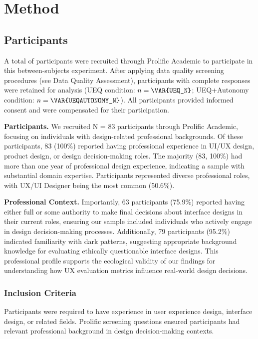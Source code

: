 
\section{Method}

\subsection{Participants}
A total of \texttt{} participants were recruited through Prolific Academic to participate in this between-subjects experiment. After applying data quality screening procedures (see Data Quality Assessment), \texttt{} participants with complete responses were retained for analysis (UEQ condition: $n = \texttt{\VAR{UEQ\_N}}$; UEQ+Autonomy condition: $n = \texttt{\VAR{UEQAUTONOMY\_N}}$). All participants provided informed consent and were compensated \texttt{} for their participation.

\textbf{Participants.} We recruited N = 83 participants through Prolific Academic, focusing on individuals with design-related professional backgrounds. Of these participants, 83 (100\%) reported having professional experience in UI/UX design, product design, or design decision-making roles. The majority (83, 100\%) had more than one year of professional design experience, indicating a sample with substantial domain expertise. Participants represented diverse professional roles, with UX/UI Designer being the most common (50.6\%).

\textbf{Professional Context.} Importantly, 63 participants (75.9\%) reported having either full or some authority to make final decisions about interface designs in their current roles, ensuring our sample included individuals who actively engage in design decision-making processes. Additionally, 79 participants (95.2\%) indicated familiarity with dark patterns, suggesting appropriate background knowledge for evaluating ethically questionable interface designs. This professional profile supports the ecological validity of our findings for understanding how UX evaluation metrics influence real-world design decisions.


\subsubsection{Inclusion Criteria}
Participants were required to have experience in user experience design, interface design, or related fields. Prolific screening questions ensured participants had relevant professional background in design decision-making contexts.

